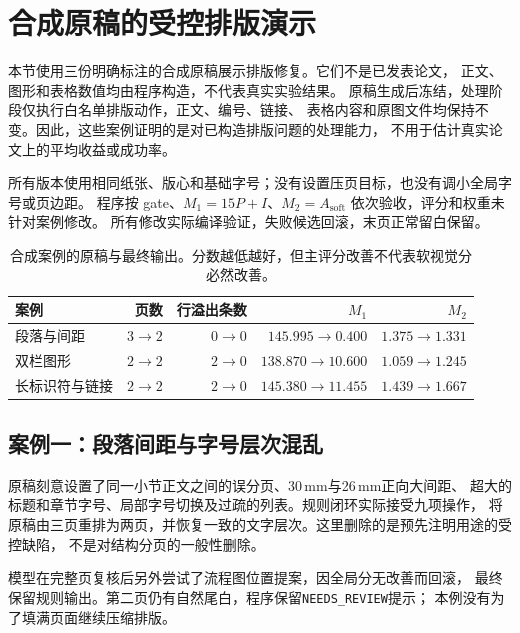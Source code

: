 \providecommand{\syntheticAssetRoot}{}
\providecommand{\syntheticCaseBreak}{}
\section{合成原稿的受控排版演示}
\label{app:synthetic-layout-cases}

本节使用三份明确标注的合成原稿展示排版修复。它们不是已发表论文，
正文、图形和表格数值均由程序构造，不代表真实实验结果。
原稿生成后冻结，处理阶段仅执行白名单排版动作，正文、编号、链接、
表格内容和原图文件均保持不变。因此，这些案例证明的是对已构造排版问题的处理能力，
不用于估计真实论文上的平均收益或成功率。

所有版本使用相同纸张、版心和基础字号；没有设置压页目标，也没有调小全局字号或页边距。
程序按 gate、$M_1=15P+I$、$M_2=A_{\mathrm{soft}}$ 依次验收，评分和权重未针对案例修改。
所有修改实际编译验证，失败候选回滚，末页正常留白保留。

\begin{table}[!htbp]
\centering\small
\caption{合成案例的原稿与最终输出。分数越低越好，但主评分改善不代表软视觉分必然改善。}
\label{tab:synthetic-case-results}
\begin{tabular}{lrrrr}
\toprule
案例 & 页数 & 行溢出条数 & $M_1$ & $M_2$ \\
\midrule
段落与间距 & $3\to2$ & $0\to0$ & $145.995\to0.400$ & $1.375\to1.331$ \\
双栏图形 & $2\to2$ & $2\to0$ & $138.870\to10.600$ & $1.059\to1.245$ \\
长标识符与链接 & $2\to2$ & $2\to0$ & $145.380\to11.455$ & $1.439\to1.667$ \\
\bottomrule
\end{tabular}
\end{table}

\syntheticCaseBreak
\subsection{案例一：段落间距与字号层次混乱}
原稿刻意设置了同一小节正文之间的误分页、30\,mm与26\,mm正向大间距、
超大的标题和章节字号、局部字号切换及过疏的列表。规则闭环实际接受九项操作，
将原稿由三页重排为两页，并恢复一致的文字层次。这里删除的是预先注明用途的受控缺陷，
不是对结构分页的一般性删除。

模型在完整页复核后另外尝试了流程图位置提案，因全局分无改善而回滚，
最终保留规则输出。第二页仍有自然尾白，程序保留\texttt{NEEDS\_REVIEW}提示；
本例没有为了填满页面继续压缩排版。

